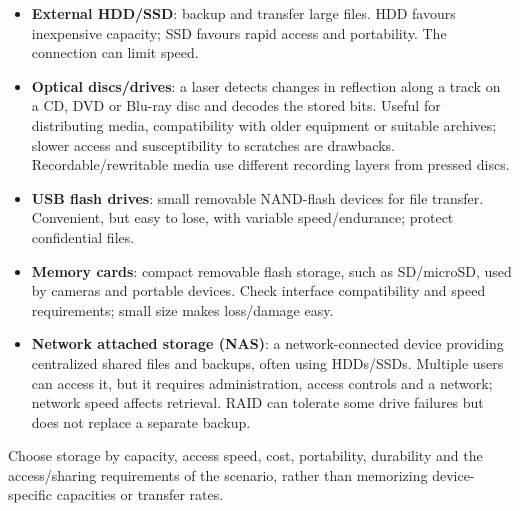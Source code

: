 \documentclass[a4paper,12pt]{article}
\begin{document}
\begin{itemize}
    \item \textbf{External HDD/SSD}: backup and transfer large files. HDD favours inexpensive capacity; SSD favours rapid access and portability. The connection can limit speed.
    \item \textbf{Optical discs/drives}: a laser detects changes in reflection along a track on a CD, DVD or Blu-ray disc and decodes the stored bits. Useful for distributing media, compatibility with older equipment or suitable archives; slower access and susceptibility to scratches are drawbacks. Recordable/rewritable media use different recording layers from pressed discs.
    \item \textbf{USB flash drives}: small removable NAND-flash devices for file transfer. Convenient, but easy to lose, with variable speed/endurance; protect confidential files.
    \item \textbf{Memory cards}: compact removable flash storage, such as SD/microSD, used by cameras and portable devices. Check interface compatibility and speed requirements; small size makes loss/damage easy.
    \item \textbf{Network attached storage (NAS)}: a network-connected device providing centralized shared files and backups, often using HDDs/SSDs. Multiple users can access it, but it requires administration, access controls and a network; network speed affects retrieval. RAID can tolerate some drive failures but does not replace a separate backup.
\end{itemize}
Choose storage by capacity, access speed, cost, portability, durability and the access/sharing requirements of the scenario, rather than memorizing device-specific capacities or transfer rates.
\end{document}
